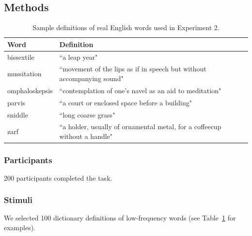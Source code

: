 \subsection{Methods}



\begin{table}[t!]
\centering

\begin{tabular}{ll}
\toprule
\textbf{Word} & \textbf{Definition}                \\
\toprule
   bissextile & ``a leap year"\\
   mussitation  &  \multicolumn{1}{p{12cm}}{ ``movement of the lips as if in speech but without accompanying sound"}    \\
   omphaloskepsis  &  \multicolumn{1}{p{12cm}}{ ``contemplation of one's navel as an aid to meditation"}                  \\
   parvis    &  \multicolumn{1}{p{12cm}}{ ``a court or enclosed space before a building"}                               \\
   sniddle      &  \multicolumn{1}{p{12cm}}{ ``long coarse grass"}     \\
   zarf     & \multicolumn{1}{p{12cm}}{ ``a holder, usually of ornamental metal, for a coffeecup without a handle"}                                 \\

 \bottomrule
\end{tabular}
\caption{Sample definitions of real English words used in Experiment 2.}
\label{tab:sample_word_defs}
\end{table}
\subsubsection{Participants}
200 participants completed the task.
\subsubsection{Stimuli}
We selected 100 dictionary definitions of low-frequency words (see Table~\ref{tab:sample_word_defs} for examples). 
